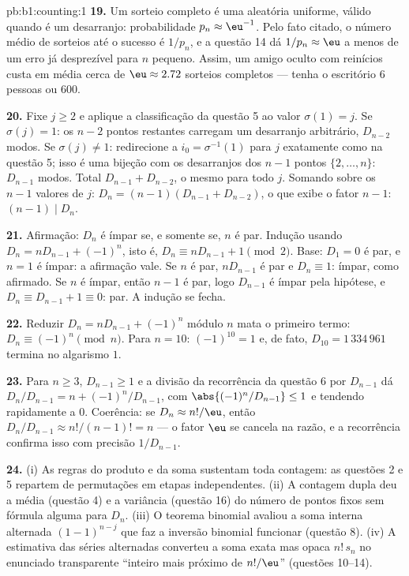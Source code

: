 \begin{solution}{pb:b1:counting:1}
\textbf{19.} Um sorteio completo é uma  aleatória uniforme,
válido quando é um desarranjo: probabilidade $p_n \approx \eu^{-1}$.
Pelo fato citado, o número médio de sorteios até o sucesso é
$1/p_n$, e a questão 14 dá $1/p_n \approx \eu$ a menos de um erro
já desprezível para $n$ pequeno. Assim, um amigo oculto com
reinícios custa em média cerca de $\eu \approx 2.72$ sorteios
completos --- tenha o escritório $6$ pessoas ou $600$.

\textbf{20.} Fixe $j \geq 2$ e aplique a classificação da questão 5 ao
valor $\sigma(1) = j$. Se $\sigma(j) = 1$: os $n - 2$ pontos restantes
carregam um desarranjo arbitrário, $D_{n-2}$ modos. Se
$\sigma(j) \neq 1$: redirecione a  $i_0 = \sigma^{-1}(1)$ para
$j$ exatamente como na questão 5; isso é uma bijeção com os
desarranjos dos $n - 1$ pontos $\{2, \dots, n\}$: $D_{n-1}$
modos. Total $D_{n-1} + D_{n-2}$, o mesmo para todo $j$. Somando
sobre os $n - 1$ valores de $j$: $D_n = (n-1)(D_{n-1} + D_{n-2})$,
o que exibe o fator $n - 1$: $(n-1) \mid D_n$.

\textbf{21.} Afirmação: $D_n$ é ímpar se, e somente se, $n$ é par. Indução usando
$D_n = nD_{n-1} + (-1)^n$, isto é, $D_n \equiv nD_{n-1} + 1 \pmod 2$.
Base: $D_1 = 0$ é par, e $n = 1$ é ímpar: a afirmação vale. Se $n$ é par,
$nD_{n-1}$ é par e $D_n \equiv 1$: ímpar, como afirmado. Se $n$ é
ímpar, então $n - 1$ é par, logo $D_{n-1}$ é ímpar pela hipótese, e
$D_n \equiv D_{n-1} + 1 \equiv 0$: par. A indução se fecha.

\textbf{22.} Reduzir $D_n = nD_{n-1} + (-1)^n$ módulo $n$ mata
o primeiro termo: $D_n \equiv (-1)^n \pmod n$. Para $n = 10$:
$(-1)^{10} = 1$ e, de fato, $D_{10} = 1\,334\,961$ termina no
algarismo $1$.

\textbf{23.} Para $n \geq 3$, $D_{n-1} \geq 1$ e a divisão da
recorrência da questão 6 por $D_{n-1}$ dá $D_n/D_{n-1} = n +
(-1)^n/D_{n-1}$, com $\abs{(-1)^n/D_{n-1}} \leq 1$ e tendendo
rapidamente a $0$. Coerência: se $D_n \approx n!/\eu$, então
$D_n/D_{n-1} \approx n!/(n-1)! = n$ --- o fator $\eu$ se cancela
na razão, e a recorrência confirma isso com precisão
$1/D_{n-1}$.

\textbf{24.} (i) As regras do produto e da soma sustentam toda contagem:
as questões 2 e 5 repartem  de permutações em etapas
independentes. (ii) A contagem dupla deu a média (questão 4) e a
variância (questão 16) do número de pontos fixos sem fórmula alguma
para $D_n$. (iii) O teorema binomial avaliou a
soma interna alternada $(1-1)^{n-j}$ que faz a inversão binomial
funcionar (questão 8). (iv) A estimativa das séries alternadas converteu
a soma exata mas opaca $n!\,s_n$ no enunciado transparente
``inteiro mais próximo de $n!/\eu$'' (questões 10--14).


\end{solution}
